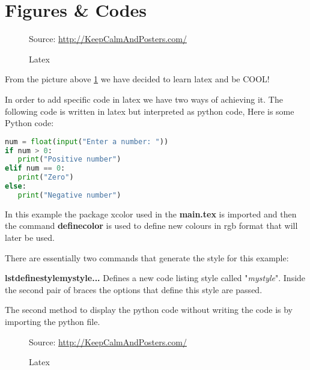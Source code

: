 \section{Figures \& Codes}
\label{sec:fig}

\begin{figure}[thb]
\centering

%
{\scriptsize%
            Source: \url{http://KeepCalmAndPosters.com/}}
\caption{Latex}
\label{fig:learnLatex}
\end{figure}
From the picture above \ref{fig:learnLatex} we have decided to learn latex and be COOL!

In order to add specific code in latex we have two ways of achieving it. The following code is written in latex but interpreted as python code,
\lstset{style=mystyle} 
Here is some Python code:
\begin{lstlisting}[language=Python, caption= Python Example Code]
num = float(input("Enter a number: "))
if num > 0:
   print("Positive number")
elif num == 0:
   print("Zero")
else:
   print("Negative number")
\end{lstlisting}
In this example the package xcolor used in the \textbf{main.tex} is imported and then the command \textbf{definecolor{}{}{}} is used to define new colours in rgb format that will later be used. 

There are essentially two commands that generate the style for this example:

\textbf{lstdefinestyle{mystyle}{...}}
Defines a new code listing style called "\textit{mystyle}". Inside the second pair of braces the options that define this style are passed.

The second method to display the python code without writing the code is by importing the python file. 



\clearpage

\lipsum[1-2]


\begin{figure}[thb]
\centering

%
{\scriptsize%
            Source: \url{http://KeepCalmAndPosters.com/}}
\caption{Latex}
\label{fig:learnLatexCompleteSize}
\end{figure}

\lipsum[2-6]